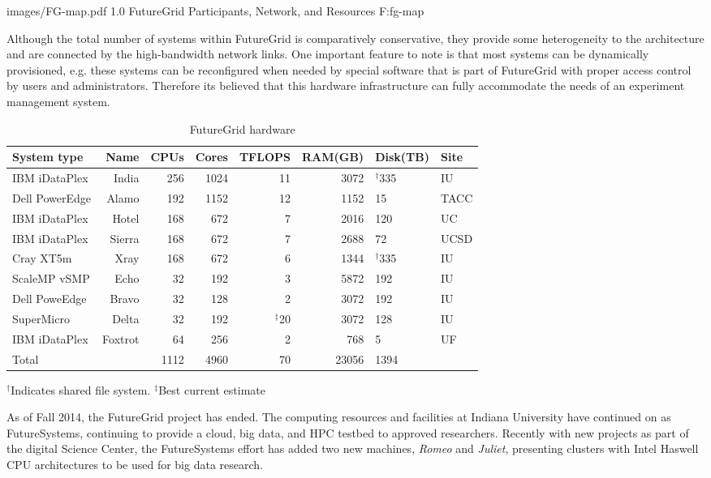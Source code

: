   {images/FG-map.pdf}
  {1.0}
  {FutureGrid Participants, Network, and Resources}
  {F:fg-map}

Although the total number of systems within FutureGrid is comparatively conservative, they provide some heterogeneity to the architecture and are connected by the high-bandwidth network links. One important feature to note is that most systems can be dynamically provisioned, e.g. these systems can be reconfigured when needed by special software that is part of FutureGrid with proper access control by users and administrators.  Therefore its believed that this hardware infrastructure can fully accommodate the needs of an experiment management system.

\begin{table}
\caption{FutureGrid hardware}\label{T:fg-hardware}
\begin{tabular}{lrrrrrll}
\hline
System type & 
Name&
CPUs& 
Cores& 
TFLOPS& 
RAM(GB)& 
Disk(TB)& 
 Site \\
\hline
IBM iDataPlex	& India		& 256	& 1024	& 11	& 3072	& $^{\dagger}$335		& IU \\
\hline
Dell PowerEdge	& Alamo		& 192	& 1152	& 12	& 1152	& 15		        & TACC \\
\hline
IBM iDataPlex	& Hotel 	& 168	& 672	& 7	& 2016	& 120	 	        & UC \\
\hline
IBM iDataPlex	& Sierra	& 168	& 672	& 7	& 2688	& 72		& UCSD \\
\hline
Cray XT5m	& Xray		& 168	& 672	& 6	& 1344	& $^{\dagger}$335		& IU \\
\hline
ScaleMP vSMP	& Echo		& 32	& 192	& 3	& 5872	& 192		& IU \\
\hline
Dell PoweEdge	& Bravo		& 32	& 128	& 2	& 3072	& 192		& IU \\
\hline
SuperMicro	& Delta		& 32	& 192	& $^{\ddagger}$20	& 3072	& 128		& IU \\
\hline
IBM iDataPlex	& Foxtrot 	& 64	& 256	& 2	& 768	& 5 		& UF \\
\hline
\hline
Total	        & 	& 1112	& 4960	& 70	& 23056	& 1394           & \\		
\hline
\end{tabular}

$^{\dagger}$Indicates shared file system. $^{\ddagger}$Best current estimate
\end{table}

As of Fall 2014, the FutureGrid project has ended. The computing resources and facilities at Indiana University have continued on as FutureSystems, continuing to provide a cloud, big data, and HPC testbed to approved researchers. Recently with new projects as part of the digital Science Center, the FutureSystems effort has added two new machines, \emph{Romeo} and \emph{Juliet}, presenting clusters with Intel Haswell CPU architectures to be used for big data research.  

